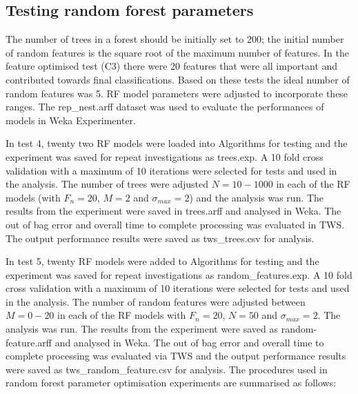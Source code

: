 \subsection{Testing random forest parameters}\label{sec:random-forest-parameters}

The number of trees in a forest should be initially set to 200; the initial number of random features is the square root of the maximum number of features. In the feature optimised test (C3) there were 20 features that were all important and contributed towards final classifications. Based on these tests the ideal number of random features was 5. \ac{RF} model parameters were adjusted to incorporate these ranges. The rep\_nest.arff dataset was used to evaluate the performances of models in \ac{Weka} Experimenter.

In test 4, twenty two \ac{RF} models were loaded into Algorithms for testing and the experiment was saved for repeat investigations as trees.exp. A 10 fold cross validation with a maximum of 10 iterations were selected for tests and used in the analysis. The number of trees were adjusted $N = 10-1000$ in each of the \ac{RF} models (with $F_n = 20$, $M = 2$ and $\sigma_{max} = 2$) and the analysis was run. The results from the experiment were saved in trees.arff and analysed in Weka. The out of bag error and overall time to complete processing was evaluated in \ac{TWS}. The output performance results were saved as tws\_trees.csv for analysis.

In test 5, twenty \ac{RF} models were added to Algorithms for testing and the experiment was saved for repeat investigations as random\_features.exp. A 10 fold cross validation with a maximum of 10 iterations were selected for tests and used in the analysis. The number of random features were adjusted between $ M = 0-20$ in each of the \ac{RF} models with $F_n = 20$, $N = 50$ and $\sigma_{max} = 2$. The analysis was run. The results from the experiment were saved as random-feature.arff and analysed in Weka. The out of bag error and overall time to complete processing was evaluated via \ac{TWS} and the output performance results were saved as tws\_random\_feature.csv for analysis. The procedures used in random forest parameter optimisation experiments are summarised as follows:

